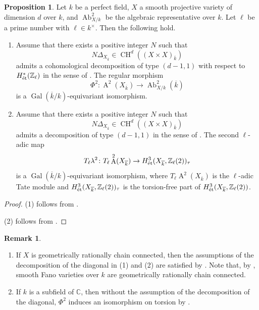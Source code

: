 \documentclass[autodetect-engine, a4paper]{amsart}
\theoremstyle{definition}
\newtheorem{prop}[thm]{Proposition}
\newtheorem{rem}[thm]{Remark}
\def\C{{\mathbb C}}
\def\Z{{\mathbb Z}}
\DeclareMathOperator\CH{\mathrm{CH}}
\DeclareMathOperator\A{\mathrm{A}}
\DeclareMathOperator\Ab{\mathrm{Ab}}
\DeclareMathOperator\Gal{\mathrm{Gal}}
\def\et{\mathop{\text{\rm \'et}}}
\begin{document}
\begin{prop}
\label{prop:representativeetale}
Let $k$ be a perfect field, $X$ a smooth projective variety of dimension $d$ over $k$, and $\Ab^2_{X/k}$ be the algebraic representative over $k$. Let $\ell$ be a prime number with $\ell \in k^{\times}$.
Then the following hold. 
\begin{enumerate}
\item 
Assume that there exists a positive integer $N$ such that 
\[
N \Delta_{X_{\overline{k}}} \in \CH^d((X \times X)_{\overline{k}})
\]
admits a cohomological decomposition of type $(d-1,1)$ with respect to $H^{\ast}_{\et} (\Z_{\ell})$ in the sense of \cite[Definition 6.1]{ACMVdecomposition}.
The regular morphism 
\[
\Phi^2 \colon
\A^2 (X_{\overline{k}}) \rightarrow \Ab^2_{X/k} (\overline{k})
\]
is a $\Gal(\overline{k}/k)$-equivariant isomorphism.
\item
Assume that there exists a positive integer $N$ such that 
\[
N \Delta_{X_{\overline{k}}} \in \CH^d((X \times X)_{\overline{k}})
\]
admits a decomposition of type $(d-1,1)$ in the sense of \cite[Subsection 3.1]{ACMVbloch}.
The second $\ell$-adic map 
\[
T_{\ell} \lambda^2 \colon T_{\ell} \A^2(X_{\overline{k}}) \rightarrow H^3_{\et} (X_{\overline{k}}, \Z_{\ell} (2))_{\tau}
\]
is a $\Gal(\overline{k}/k)$-equivariant isomorphism, where 
$T_{\ell} \A^2(X_{\overline{k}})$ is the $\ell$-adic Tate module and
$H^3_{\et} (X_{\overline{k}}, \Z_{\ell} (2))_{\tau}$ is the torsion-free part of $H^3_{\et} (X_{\overline{k}},\Z_{\ell} (2))$.
\end{enumerate}
\end{prop}

\begin{proof}
(1) follows from \cite[Proposition 10.1]{ACMVdecomposition}.

(2) follows from \cite[Proposition 5.1]{ACMVbloch}.
\end{proof}

\begin{rem}
\label{rem:representative}
\begin{enumerate}
\item 
If $X$ is geometrically rationally chain connected, then the assumptions of the decomposition of the diagonal in (1) and (2) are satisfied by \cite[Remark 2.8]{ACMVdecomposition}. Note that, by \cite[Ch.V, 2.14]{Kollarrationalcurves},
smooth Fano varieties over $k$ are geometrically rationally chain connected.
\item
If $k$ is a subfield of $\C$, then without the assumption of the decomposition of the diagonal, $\Phi^2$ induces an isomorphism on torsion by \cite[Proposition 1.5]{ACMVdecomposition}.
\end{enumerate}
\end{rem}
\end{document}
